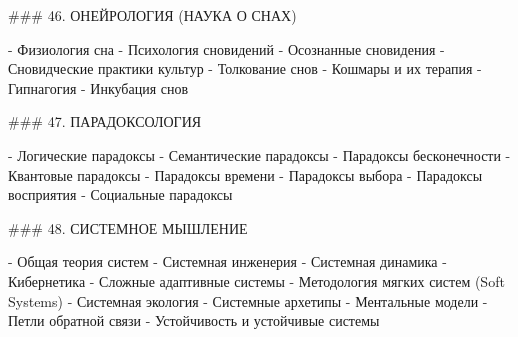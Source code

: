 ### 46. ОНЕЙРОЛОГИЯ (НАУКА О СНАХ)

- Физиология сна
- Психология сновидений
- Осознанные сновидения
- Сновидческие практики культур
- Толкование снов
- Кошмары и их терапия
- Гипнагогия
- Инкубация снов

### 47. ПАРАДОКСОЛОГИЯ

- Логические парадоксы
- Семантические парадоксы
- Парадоксы бесконечности
- Квантовые парадоксы
- Парадоксы времени
- Парадоксы выбора
- Парадоксы восприятия
- Социальные парадоксы

### 48. СИСТЕМНОЕ МЫШЛЕНИЕ

- Общая теория систем
- Системная инженерия
- Системная динамика
- Кибернетика
- Сложные адаптивные системы 
- Методология мягких систем (Soft Systems)
- Системная экология
- Системные архетипы
- Ментальные модели
- Петли обратной связи
- Устойчивость и устойчивые системы